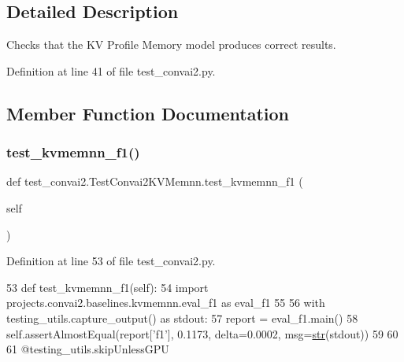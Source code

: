 \subsection{Detailed Description}
\begin{DoxyVerb}Checks that the KV Profile Memory model produces correct results.
\end{DoxyVerb}
 

Definition at line 41 of file test\+\_\+convai2.\+py.



\subsection{Member Function Documentation}
\mbox{\label{classtest__convai2_1_1TestConvai2KVMemnn_a85c9f140bc57a1f1e8b011a2034e74fc}} 
\subsubsection{\texorpdfstring{test\+\_\+kvmemnn\+\_\+f1()}{test\_kvmemnn\_f1()}}
{\footnotesize\ttfamily def test\+\_\+convai2.\+Test\+Convai2\+K\+V\+Memnn.\+test\+\_\+kvmemnn\+\_\+f1 (\begin{DoxyParamCaption}\item[{}]{self }\end{DoxyParamCaption})}



Definition at line 53 of file test\+\_\+convai2.\+py.


\begin{DoxyCode}
53     \textcolor{keyword}{def }test\_kvmemnn\_f1(self):
54         \textcolor{keyword}{import} projects.convai2.baselines.kvmemnn.eval\_f1 \textcolor{keyword}{as} eval\_f1
55 
56         with testing\_utils.capture\_output() \textcolor{keyword}{as} stdout:
57             report = eval\_f1.main()
58         self.assertAlmostEqual(report[\textcolor{stringliteral}{'f1'}], 0.1173, delta=0.0002, msg=\hyperlink{namespacegenerate__task__READMEs_a5b88452ffb87b78c8c85ececebafc09f}{str}(stdout))
59 
60 
61 @testing\_utils.skipUnlessGPU
\end{DoxyCode}
\mbox{\label{classtest__convai2_1_1TestConvai2KVMemnn_a8d4b821e481c61a125658e0ac5045762}} 
